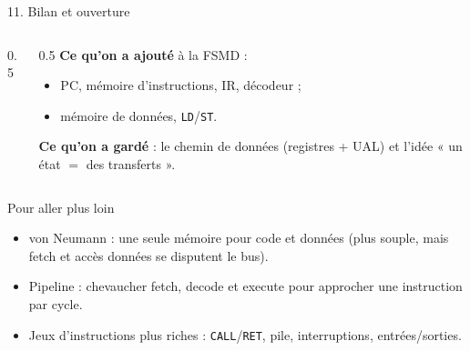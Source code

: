 \begin{frame}{11. Bilan et ouverture}
\begin{columns}[T]
\begin{column}{0.5\textwidth}
\centering
{}
\hspace{3mm}
\end{column}
\begin{column}{0.5\textwidth}
\footnotesize
\textbf{Ce qu'on a ajouté} à la FSMD :
\begin{itemize}\setlength{\itemsep}{1pt}
 \item PC, mémoire d'instructions, IR, décodeur ;
 \item mémoire de données, \texttt{LD}/\texttt{ST}.
\end{itemize}
\textbf{Ce qu'on a gardé} : le chemin de données (registres + UAL) et l'idée « un état $=$ des transferts ».
\end{column}
\end{columns}

\vspace{3mm}
\begin{block}{Pour aller plus loin}
\footnotesize
\begin{itemize}\setlength{\itemsep}{2pt}
 \item \alert{von Neumann} : une seule mémoire pour code et données (plus souple, mais fetch et accès données se disputent le bus).
 \item \alert{Pipeline} : chevaucher fetch, decode et execute pour approcher une instruction par cycle.
 \item Jeux d'instructions plus riches : \texttt{CALL}/\texttt{RET}, pile, interruptions, entrées/sorties.
\end{itemize}
\end{block}
\end{frame}
